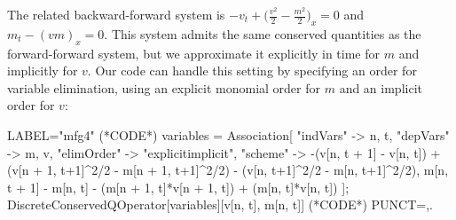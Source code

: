\documentclass[runningheads]{llncs}
\newcommand{\1}{\chi}
\begin{document}
\begin{example}
	The related backward-forward system is
$
		-v_t+\Big(\frac{v^2}{2}-\frac{m^2}{2}\Big)_x=0$ and $
		m_t-(vm)_x=0.
$
	This system admits the same conserved quantities as the forward-forward system, but we approximate it explicitly in time for $m$ and implicitly for $v$.
	Our code can handle this setting by specifying an order for variable elimination, using an explicit monomial order for $m$ and an implicit order for $v$:
	\begin{EXE}
		LABEL="mfg4"
		(*CODE*)
		variables = Association[
		"indVars" -> {n, t},
		"depVars" -> {m, v},
		"elimOrder" -> "explicitimplicit",
		"scheme" -> {-(v[n, t + 1] - 
			v[n, t]) + (v[n + 1, t+1]^2/2 - m[n + 1, t+1]^2/2) - (v[n, t+1]^2/2 - 
			m[n, t+1]^2/2), 
			m[n, t + 1] - 
			m[n, t] - (m[n + 1, t]*v[n + 1, t]) + (m[n, t]*v[n, t])}
		];
		DiscreteConservedQOperator[variables][{v[n, t], m[n, t]}]
		(*CODE*)
		PUNCT={,.}
	\end{EXE}
	\begin{small}
		
		
	\end{small}
\end{example}
\end{document}
